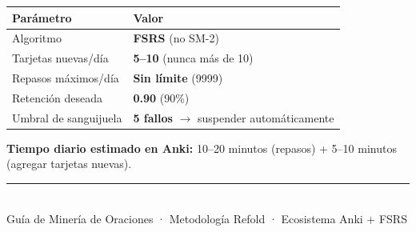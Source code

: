 \documentclass[12pt,a4paper]{article}
\begin{document}
\begin{cajaprincipio}
\begin{tabularx}{\textwidth}{@{} l X @{}}
\toprule
\textbf{Parámetro} & \textbf{Valor} \\
\midrule
Algoritmo & \textbf{FSRS} (no SM-2) \\
Tarjetas nuevas/día & \textbf{5--10} (nunca más de 10) \\
Repasos máximos/día & \textbf{Sin límite} (9999) \\
Retención deseada & \textbf{0.90} (90\%) \\
Umbral de sanguijuela & \textbf{5 fallos} $\rightarrow$ suspender automáticamente \\
\bottomrule
\end{tabularx}

\medskip
\textbf{Tiempo diario estimado en Anki:} 10--20 minutos (repasos) + 5--10 minutos (agregar tarjetas nuevas).
\end{cajaprincipio}

\vfill
\begin{center}
\rule{0.5\textwidth}{0.5pt}\\[0.3cm]
{\small\color{grissuave} Guía de Minería de Oraciones · Metodología Refold · Ecosistema Anki + FSRS}
\end{center}
\end{document}

